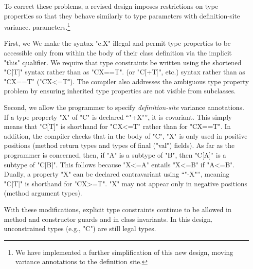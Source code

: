 To correct these problems, a
revised \Xten design
imposes
restrictions on type properties so that they 
behave similarly to type
\ifwild
parameters with definition-site variance.
\else
parameters.\footnote{We have implemented a further
simplification of this new design, moving variance annotations
to the definition site.}
\fi

\ifwild
First, we
\else
We
\fi
make the syntax \xcd"e.X"
illegal and permit type properties to be accessible only from
within the body of their class definition via the
implicit \xcd"this" qualifier.  We require that type
constraints be written using the shortened \xcd"C[T]"
\ifwild
syntax rather than as \xcd"C{X==T}".
\else
(or \xcd"C[+T]", etc.) syntax rather than as \xcd"C{X==T}" (\xcd"C{X<=T}").
\fi
The compiler also addresses the
ambiguous type property problem by ensuring inherited type properties are
not visible from subclasses.

\ifwild
Second, we allow the programmer to specify
\emph{definition-site}
variance annotations.
If a type property \xcd"X" of \xcd"C" is declared ``\xcd"+X"'', it is
covariant.
This simply means that \xcd"C[T]"
is shorthand for \xcd"C{X<=T}" rather than for \xcd"C{X==T}".
In addition, the compiler checks that in the body of \xcd"C",
\xcd"X" is only used in positive positions (method return types
and types of final (\xcd"val") fields).
As far as the programmer is concerned, then, if \xcd"A"
is a subtype of \xcd"B", then
\xcd"C[A]" is a subtype of \xcd"C[B]".
This follows because \xcd"X<=A" entails \xcd"X<=B" if \xcd"A<=B".
Dually, a property \xcd"X" can be declared contravariant 
using ``\xcd"-X"'', meaning \xcd"C[T]" is shorthand for
\xcd"C{X>=T}".  \xcd"X" may not appear only in negative
positions (method argument types).
\fi

With these
modifications, explicit type constraints continue to be allowed
in method and constructor guards and in class invariants.
\ifwild\else
In this design, unconstrained types (e.g., \xcd"C") are still legal types.
\fi

